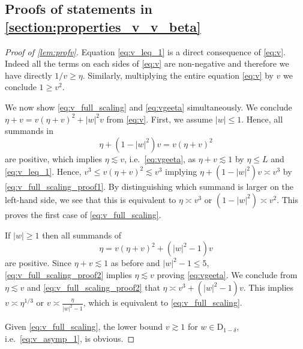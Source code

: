 \documentclass[11pt]{article}
\newcommand{\abs}[1]{\left| #1 \right|}
\theoremstyle{plain}
\theoremstyle{remark}
\numberwithin{equation}{section}
\begin{document}
	\subsection{Proofs of statements in \cref{section:properties_v_v_beta}}\label{subsection:proof_properties_v}
	\begin{proof}[Proof of \cref{lem:profv}]
		
		Equation \cref{eq:v_leq_1} is a direct consequence of \cref{eq:v}. Indeed all the terms on each sides of \cref{eq:v} are non-negative and therefore we have directly $1/v \ge \eta $. Similarly, multiplying the entire equation \cref{eq:v} by $v$ we conclude $1 \ge v^2$. 
		
		
		
		We now show \cref{eq:v_full_scaling} and \cref{eq:vgeeta} simultaneously. We conclude $\eta + v = v(\eta + v)^2 + \abs{w}^2 v$ from \cref{eq:v}.  
		First, we assume $\abs{w} \leq 1$. Hence, all summands in 
		\begin{equation} \label{eq:v_full_scaling_proof1} 
			\eta + (1 - \abs{w}^2)v = v(\eta + v)^2 
		\end{equation} 
		are positive, 
		which implies $\eta \lesssim v$, i.e.\ \cref{eq:vgeeta}, as 
		$\eta + v \lesssim 1$ by $\eta \leq L$ and \cref{eq:v_leq_1}. 
		Hence, $v^3 \leq v (\eta +v)^2 \lesssim v^3$ implying $\eta + (1- \abs{w}^2) v \asymp v^3$ by \cref{eq:v_full_scaling_proof1}. By distinguishing which summand is larger on the left-hand side, we see that this is equivalent to $ \eta\asymp v^3$ or $(1- \abs{w}^2) \asymp v^2$. This proves the first case of \cref{eq:v_full_scaling}. 
		
		If $\abs{w} \geq 1$ then all summands of 
		\begin{equation} \label{eq:v_full_scaling_proof2} 
			\eta  = v(\eta + v)^2  + (\abs{w}^2-1)v
		\end{equation} 
		are positive. Since $\eta + v \lesssim 1$ as before and $\abs{w}^2 - 1 \leq 5$, \eqref{eq:v_full_scaling_proof2} 
		implies $\eta \lesssim v$ proving \eqref{eq:vgeeta}. 
		We conclude from $\eta \lesssim v$ and \eqref{eq:v_full_scaling_proof2} that $\eta \asymp v^3 + (\abs{w}^2 - 1)v$. 
		This implies $v \asymp \eta^{1/3}$ or $v \asymp \frac{\eta}{\abs{w}^2 -1}$, which is equivalent to \eqref{eq:v_full_scaling}. 
		
		Given \eqref{eq:v_full_scaling}, the lower bound $v \gtrsim 1$ for $w \in \mathrm{D}_{1-\delta}$, i.e.\ \eqref{eq:v_asymp_1}, is obvious. 
	\end{proof} 
	
\end{document}
